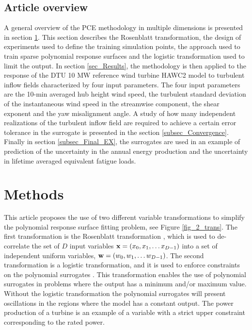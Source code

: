 \documentclass[preprint,12pt]{elsarticle}
\begin{document}
\subsection{Article overview}

A general overview of the PCE methodology in multiple dimensions is presented in section \ref{sec_Methods}. This section describes the Rosenblatt transformation, the design of experiments used to define the training simulation points, the approach used to train sparse polynomial response surfaces and the logistic transformation used to limit the output. In section \ref{sec_Results}, the methodology is then applied to the response of the DTU 10 MW reference wind turbine HAWC2 model \cite{bak2012light} to turbulent inflow fields characterized by four input parameters. The four input parameters are the 10-min averaged hub height wind speed, the turbulent standard deviation of the instantaneous wind speed in the streamwise component, the shear exponent and the yaw misalignment angle. A study of how many independent realizations of the turbulent inflow field are required to achieve a certain error tolerance in the surrogate is presented in the section \ref{subsec_Convergence}. Finally in section \ref{subsec_Final_EX}, the surrogates are used in an example of prediction of the uncertainty in the annual energy production and the uncertainty in lifetime averaged equivalent fatigue loads.

\section{Methods}
\label{sec_Methods}

This article proposes the use of two different variable transformations to simplify the polynomial response surface fitting problem, see Figure \ref{fig_2_trans}. The first transformation is the Rosenblatt transformation \cite{rosenblatt1952}, which is used to de-correlate the set of $D$ input variables $\mathbf{x} = (x_0, x_1, \ldots x_{D-1})$ into a set of independent uniform variables, $\mathbf{w} = (w_0, w_1, \ldots w_{D-1})$. The second transformation is a logistic transformation, and it is used to enforce constraints on the polynomial surrogates \cite{simard1998transformation}. This transformation enables the use of polynomial surrogates in problems where the output has a minimum and/or maximum value. Without the logistic transformation the polynomial surrogates will present oscillations in the regions where the model has a constant output. The power production of a turbine is an example of a variable with a strict upper constraint corresponding to the rated power.
\end{document}
